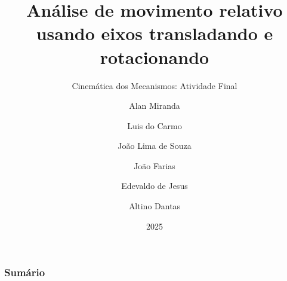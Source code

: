 

\title[UFPA]{Análise de movimento relativo usando eixos transladando e rotacionando}
\subtitle{Cinemática dos Mecanismos: Atividade Final}
\author{
    Alan Miranda \and
    Luis do Carmo \and
    João Lima de Souza \and
    João Farias \and
    Edevaldo de Jesus \and
    Altino Dantas\and
}

\date{2025}
\frame[noframenumbering]{\titlepage}



\begin{frame}
    \frametitle{Sumário}
    \tableofcontents
\end{frame}

